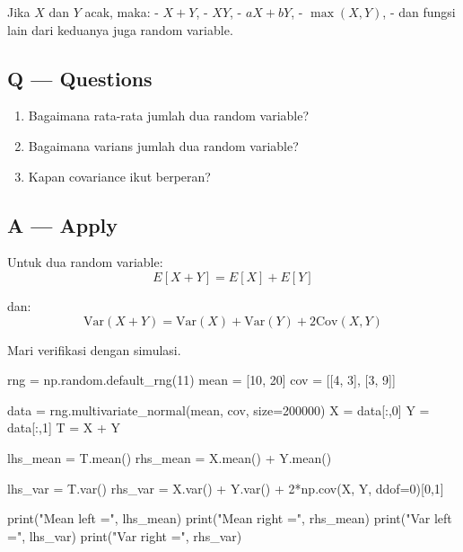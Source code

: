 \documentclass[
  letterpaper,
  DIV=11,
  numbers=noendperiod]{scrreprt}
\newenvironment{Shaded}{\begin{snugshade}}{\end{snugshade}}
\newcommand{\BuiltInTok}[1]{\textcolor[rgb]{0.00,0.23,0.31}{#1}}
\newcommand{\DecValTok}[1]{\textcolor[rgb]{0.68,0.00,0.00}{#1}}
\newcommand{\NormalTok}[1]{\textcolor[rgb]{0.00,0.23,0.31}{#1}}
\newcommand{\OperatorTok}[1]{\textcolor[rgb]{0.37,0.37,0.37}{#1}}
\newcommand{\StringTok}[1]{\textcolor[rgb]{0.13,0.47,0.30}{#1}}
\providecommand{\tightlist}{%
  \setlength{\itemsep}{0pt}\setlength{\parskip}{0pt}}
\begin{document}
Jika \(X\) dan \(Y\) acak, maka: - \(X+Y\), - \(XY\), - \(aX+bY\), -
\(\max(X,Y)\), - dan fungsi lain dari keduanya juga random variable.

\subsection{Q --- Questions}\label{q-questions-39}

\begin{enumerate}
\def\labelenumi{\arabic{enumi}.}
\tightlist
\item
  Bagaimana rata-rata jumlah dua random variable?
\item
  Bagaimana varians jumlah dua random variable?
\item
  Kapan covariance ikut berperan?
\end{enumerate}

\subsection{A --- Apply}\label{a-apply-38}

Untuk dua random variable: \[
E[X+Y] = E[X] + E[Y]
\]

dan: \[
\mathrm{Var}(X+Y)=\mathrm{Var}(X)+\mathrm{Var}(Y)+2\mathrm{Cov}(X,Y)
\]

Mari verifikasi dengan simulasi.

\begin{Shaded}
\begin{Highlighting}[]
\NormalTok{rng }\OperatorTok{=}\NormalTok{ np.random.default\_rng(}\DecValTok{11}\NormalTok{)}
\NormalTok{mean }\OperatorTok{=}\NormalTok{ [}\DecValTok{10}\NormalTok{, }\DecValTok{20}\NormalTok{]}
\NormalTok{cov }\OperatorTok{=}\NormalTok{ [[}\DecValTok{4}\NormalTok{, }\DecValTok{3}\NormalTok{],}
\NormalTok{       [}\DecValTok{3}\NormalTok{, }\DecValTok{9}\NormalTok{]]}

\NormalTok{data }\OperatorTok{=}\NormalTok{ rng.multivariate\_normal(mean, cov, size}\OperatorTok{=}\DecValTok{200000}\NormalTok{)}
\NormalTok{X }\OperatorTok{=}\NormalTok{ data[:,}\DecValTok{0}\NormalTok{]}
\NormalTok{Y }\OperatorTok{=}\NormalTok{ data[:,}\DecValTok{1}\NormalTok{]}
\NormalTok{T }\OperatorTok{=}\NormalTok{ X }\OperatorTok{+}\NormalTok{ Y}

\NormalTok{lhs\_mean }\OperatorTok{=}\NormalTok{ T.mean()}
\NormalTok{rhs\_mean }\OperatorTok{=}\NormalTok{ X.mean() }\OperatorTok{+}\NormalTok{ Y.mean()}

\NormalTok{lhs\_var }\OperatorTok{=}\NormalTok{ T.var()}
\NormalTok{rhs\_var }\OperatorTok{=}\NormalTok{ X.var() }\OperatorTok{+}\NormalTok{ Y.var() }\OperatorTok{+} \DecValTok{2}\OperatorTok{*}\NormalTok{np.cov(X, Y, ddof}\OperatorTok{=}\DecValTok{0}\NormalTok{)[}\DecValTok{0}\NormalTok{,}\DecValTok{1}\NormalTok{]}

\BuiltInTok{print}\NormalTok{(}\StringTok{"Mean left  ="}\NormalTok{, lhs\_mean)}
\BuiltInTok{print}\NormalTok{(}\StringTok{"Mean right ="}\NormalTok{, rhs\_mean)}
\BuiltInTok{print}\NormalTok{(}\StringTok{"Var left   ="}\NormalTok{, lhs\_var)}
\BuiltInTok{print}\NormalTok{(}\StringTok{"Var right  ="}\NormalTok{, rhs\_var)}
\end{Highlighting}
\end{Shaded}
\end{document}
